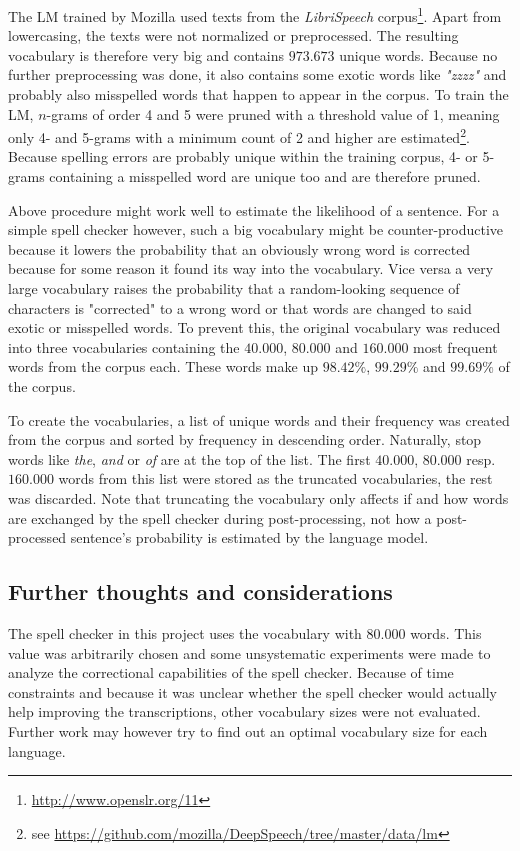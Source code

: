 The \ac{LM} trained by Mozilla used texts from the \textit{LibriSpeech} corpus\footnote{\url{http://www.openslr.org/11}}. Apart from lowercasing, the texts were not normalized or preprocessed. The resulting vocabulary is therefore very big and contains $973.673$ unique words. Because no further preprocessing was done, it also contains some exotic words like \textit{"zzzz"} and probably also misspelled words that happen to appear in the corpus. To train the \ac{LM}, $n$-grams of order 4 and 5 were pruned with a threshold value of 1, meaning only 4- and 5-grams with a minimum count of 2 and higher are estimated\footnote{see \url{https://github.com/mozilla/DeepSpeech/tree/master/data/lm}}. Because spelling errors are probably unique within the training corpus, 4- or 5-grams containing a misspelled word are unique too and are therefore pruned. 

Above procedure might work well to estimate the likelihood of a sentence. For a simple spell checker however, such a big vocabulary might be counter-productive because it lowers the probability that an obviously wrong word is corrected because for some reason it found its way into the vocabulary. Vice versa a very large vocabulary raises the probability that a random-looking sequence of characters is "corrected" to a wrong word or that words are changed to said exotic or misspelled words. To prevent this, the original vocabulary was reduced into three vocabularies containing the $40.000$, $80.000$ and $160.000$ most frequent words from the corpus each. These words make up $98.42\%$, $99.29\%$ and $99.69\%$ of the corpus.

To create the vocabularies, a list of unique words and their frequency was created from the corpus and sorted by frequency in descending order. Naturally, stop words like \textit{the}, \textit{and} or \textit{of} are at the top of the list. The first $40.000$, $80.000$ resp. $160.000$ words from this list were stored as the truncated vocabularies, the rest was discarded. Note that truncating the vocabulary only affects if and how words are exchanged by the spell checker during post-processing, not how a post-processed sentence's probability is estimated by the language model.

\subsection{Further thoughts and considerations}

The spell checker in this project uses the vocabulary with $80.000$ words. This value was arbitrarily chosen and some unsystematic experiments were made to analyze the correctional capabilities of the spell checker. Because of time constraints and because it was unclear whether the spell checker would actually help improving the transcriptions, other vocabulary sizes were not evaluated. Further work may however try to find out an optimal vocabulary size for each language.